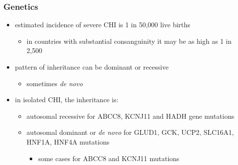 \documentclass{scrartcl}
\begin{document}
\subsubsection{Genetics}
\label{sec:org2573ddc}
\begin{itemize}
\item estimated incidence of severe CHI is 1 in 50,000 live births
\begin{itemize}
\item in countries with substantial consanguinity it may be as high as 1 in 2,500
\end{itemize}
\item pattern of inheritance can be dominant or recessive
\begin{itemize}
\item sometimes \emph{de novo}
\end{itemize}
\item in isolated CHI, the inheritance is:
\begin{itemize}
\item autosomal recessive for ABCC8, KCNJ11 and HADH gene mutations
\item autosomal dominant or \emph{de novo} for GLUD1, GCK, UCP2, SLC16A1, HNF1A, HNF4A mutations
\begin{itemize}
\item some cases for ABCC8 and KCNJ11 mutations
\end{itemize}
\end{itemize}
\end{itemize}
\end{document}
